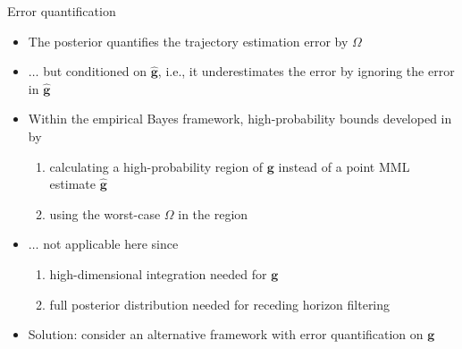\documentclass[smaller,aspectratio=169]{beamer}        %
\begin{document}
\begin{frame}{Error quantification}
\begin{refsection}
    \begin{itemize}
        \setlength\itemsep{0.5em}
        \item The posterior quantifies the trajectory estimation error by $\Omega$
        \item $\dots$ but conditioned on $\hat{\mathbf{g}}$, i.e., it underestimates the error by ignoring the error in $\hat{\mathbf{g}}$
        \item Within the empirical Bayes framework, high-probability bounds developed in \cite{10155287} by
        \begin{enumerate}
            \item calculating a high-probability region of $\mathbf{g}$ instead of a point MML estimate $\hat{\mathbf{g}}$
            \item using the worst-case $\Omega$ in the region
        \end{enumerate}
        \item $\dots$ not applicable here since
        \begin{enumerate}
            \item high-dimensional integration needed for $\mathbf{g}$
            \item full posterior distribution needed for receding horizon filtering
        \end{enumerate}
        \item \alert{Solution:} consider an alternative framework with error quantification on $\mathbf{g}$
    \end{itemize}

\vspace{2em}
\AtNextBibliography{\scriptsize}
\printbibliography
\end{refsection}
\end{frame}
\end{document}
